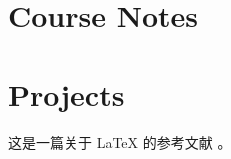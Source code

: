 \documentclass[
	draftmark = true,   %
	coverpage = cover_test.pdf,
    geometry = a4,    %
	fontsetup = font-setup-open.tex,
	titlesetup = titles-setup.tex
]{AJbook}
\numberwithin{equation}{section}
\begin{document}
	\frontmatter	%
	
	\mainmatter		%

	

	\part{Course Notes}

	

	\part{Projects}
	
	
	这是一篇关于 LaTeX 的参考文献 \cite{lamport1994latex}。

	

	\backmatter
	\printbibliography[heading=bibintoc]
	
	\listoffigures

	{\footnotesize
	\printindex}
\end{document}
